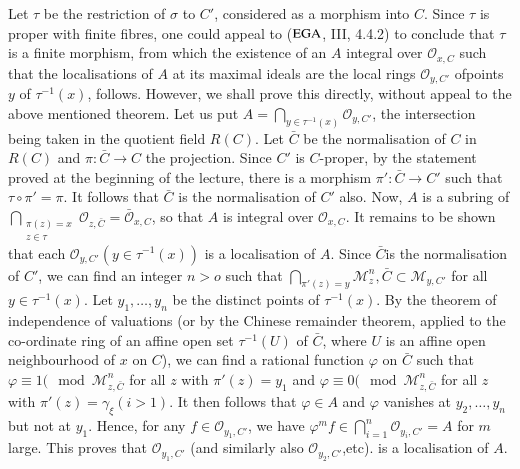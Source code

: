 Let $\tau$ be the restriction of $\sigma$ to $C'$, considered as a
morphism into $C$. Since $\tau$ is proper with finite fibres, one
could appeal to ($\operatorname{EGA}$, III, 4.4.2) to conclude that $\tau$ is a finite
morphism, from which the existence of an $A$ integral over
$\mathscr{O}_{x,C}$ such that the localisations of $A$ at its maximal
ideals are the local rings $\mathscr{O}_{y,C'}$ of\pageoriginale points $y$ of
$\tau^{-1}(x)$, follows. However, we shall prove this directly,
without appeal to the above mentioned theorem. Let us put $A = \bigcap
\limits_{y \in \tau^{-1}(x)}\mathscr{O}_{y,C'}$, the intersection
being taken in the quotient field $R(C)$. Let $\bar{C}$ be the
normalisation of $C$ in $R(C)$ and $\pi :\bar{C} \to C$ the
projection. Since $C'$ is $C$-proper, by the statement proved at the
beginning of the lecture, there is a morphism $\pi':\bar{C} \to C'$
such that $\tau \circ\pi' = \pi$. It follows that $\bar{C}$ is the
normalisation of $C'$ also. Now, $A$ is a subring of
$\bigcap\limits_{\substack{\pi (z) = x \\ {z \in \tau}}}
\mathscr{O}_{z,\bar{C}} = \bar{\mathscr{O}}_{x,C}$, so that $A$ is
integral over $\mathscr{O}_{x,C}$. It remains to be shown that each
$\mathscr{O}_{y,C'}(y \in \tau^{-1}(x))$ is a localisation of
$A$. Since $\bar{C}$is the normalisation of $C'$, we can find an
integer $n > o$ such that $\bigcap\limits_{\pi' (z)=y}
\mathcal{M}^n_z, \bar{C} \subset \mathcal{M}_{y,C'}$ for all $y \in
\tau^{-1}(x)$. Let $y_1, \ldots , y_n$ be the distinct points of
$\tau^{-1}(x)$. By the theorem of independence of valuations (or by
the Chinese remainder theorem, applied to the co-ordinate ring of an
affine open set $\tau^{-1}(U)$ of $\bar{C}$, where $U$ is an affine
open neighbourhood of $x$ on $C$), we can find a rational function
$\varphi$ on $\bar{C}$ such that $\varphi \equiv 1 (\mod
\mathcal{M}^n_{z,\bar C}$ for all $z$ with $\pi ' (z)=y_1$ and
$\varphi \equiv 0 (\mod \mathcal{M}^n_{z,\bar C}$ for all $z$ with
$\pi'(z) = \gamma_{\xi}(i > 1)$. It then follows that $\varphi \in A$
and $\varphi$ vanishes at $y_2, \ldots , y_n$ but not at $y_1$. Hence,
for any $f \in \mathscr{O}_{y_1,C'}$, we have $\varphi^m f \in
\bigcap\limits^{n}_{i=1} \mathscr{O}_{y_i,C'}=A$ for $m$ large. This
proves that $\mathscr{O}_{y_1,C'}$ (and similarly also
$\mathscr{O}_{y_2,C'}$,etc). is a localisation of $A$. 

